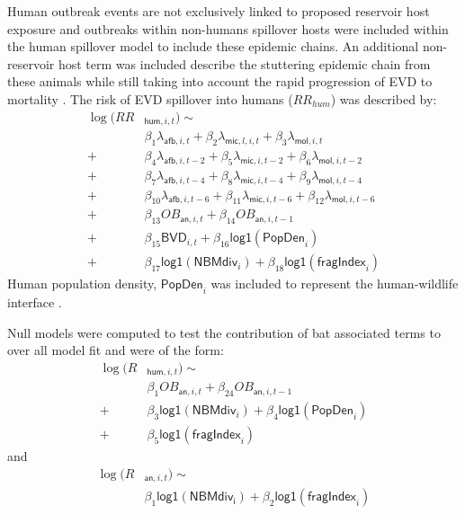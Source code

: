 \documentclass[9pt,twoside,lineno]{pnas-new}
\newcommand{\afb}{\mathsf{afb}}
\newcommand{\mic}{\mathsf{mic}}
\newcommand{\mol}{\mathsf{mol}}
\newcommand{\logplus}{\mathsf{log1}}
\begin{document}
Human outbreak events are not exclusively linked to proposed reservoir host exposure \cite{Pourrut2005TheAfrica} and outbreaks within non-humans spillover hosts were included within the human spillover model to include these epidemic chains. An additional non-reservoir host term was included describe the stuttering epidemic chain from these animals while still taking into account the rapid progression of EVD to mortality \cite{Swanepoel1996ExperimentalVirus}. The risk of EVD spillover into humans ($RR_{hum}$) was described by:
\[
    \begin{split}
\log(RR&_{\mathsf{hum}, i, t}) \sim \\
&\beta_1 \lambda_{\afb, i, t} + \beta_2 \lambda_{\mic, l, i, t} + \beta_3 \lambda_{\mol, i, t} \\
 + &\beta_4 \lambda_{\afb, i, t-2} + \beta_5 \lambda_{\mic, i, t-2} + \beta_6 \lambda_{\mol, i, t-2} \\
 + &\beta_7 \lambda_{\afb, i, t-4} + \beta_8 \lambda_{\mic, i, t-4} + \beta_9 \lambda_{\mol, i, t-4} \\
 + &\beta_{10} \lambda_{\afb, i, t-6} + \beta_{11} \lambda_{\mic, i, t-6} + \beta_{12} \lambda_{\mol, i, t-6} \\
 + &\beta_{13} OB_{\mathsf{an}, i, t} + \beta_{14} OB_{\mathsf{an},i, t-1}  \\
 +&\beta_{15} \mathsf{BVD}_{i,t} + \beta_{16} \logplus(\mathsf{PopDen}_{i})  \\
 + &\beta_{17} \logplus(\mathsf{NBM div}_{i}) + \beta_{18} \logplus(\mathsf{fragIndex}_{i})  
    \end{split}
\]
Human population density, $\mathsf{PopDen}_{i}$ was included to represent the human-wildlife interface \cite{Plowright2015EcologicalSpillover.}.  \par
Null models were computed to test the contribution of bat associated terms to over all model fit and were of the form:
\[
\begin{split}
   \log(R&_{\mathsf{hum}, i, t}) \sim \\ 
   &\beta_{1} OB_{\mathsf{an}, i, t} + \beta_{24} OB_{\mathsf{an}, i, t-1}  \\
 +&\beta_{3} \logplus(\mathsf{NBM div}_{i}) + \beta_{4} \logplus(\mathsf{PopDen}_{i})  \\
 + &\beta_{5} \logplus(\mathsf{fragIndex}_{i})
\end{split}
\]
and 
\[
\begin{split}
   \log(R& _{\mathsf{an}, i, t}) \sim \\
   & \beta_1 \logplus(\mathsf{NBM div_i}) + \beta_2 \logplus(\mathsf{fragIndex}_{i})
\end{split}
\]
\end{document}
